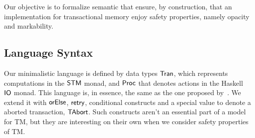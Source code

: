 \documentclass{fundam}
\def\resethooks{%
  \global\let\SaveRestoreHook\empty
  \global\let\ColumnHook\empty}
\newlength{\blanklineskip}
\let\hspre\empty
\let\hspost\empty
\newcommand{\D}[1]{\blue{\mathsf{#1}}}
\newcommand{\C}[1]{\red{\mathsf{#1}}}
\newcommand{\F}[1]{\green{\mathsf{#1}}}
\begin{document}
Our objective is to formalize semantic that ensure, by construction, that an
implementation for transactional memory enjoy safety properties, namely opacity and markability. 

\subsection{Language Syntax}\label{sec:stm-syntax}

Our minimalistic language is defined by data types \ensuremath{\D{Tran}}, which
represents computations in the \ensuremath{\D{STM}} monad, and \ensuremath{\D{Proc}} that denotes
actions in the Haskell \ensuremath{\D{IO}} monad. This language is, in essence,
the same as the one proposed by~\cite{Hu08}. We extend it with
\ensuremath{\F{orElse}}, \ensuremath{\F{retry}}, conditional constructs and a special value to
denote a aborted transaction, \ensuremath{\C{TAbort}}. Such constructs aren't
an essential part of a model for TM, but they are interesting
on their own when we consider safety properties of TM.

\resethooks
\end{document}
